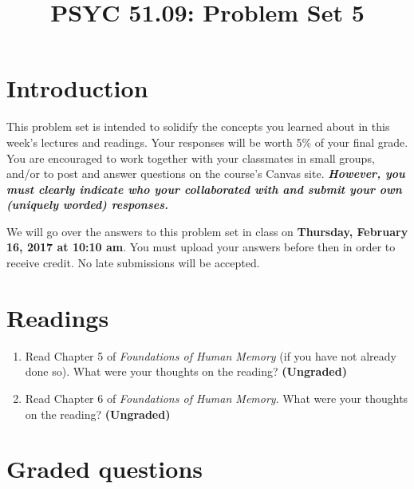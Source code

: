 \documentclass[11pt]{article}
\title{PSYC 51.09: Problem Set 5}
\date{}
\begin{document}
\maketitle
\vspace{-0.75in}
\section*{Introduction}
This problem set is intended to solidify the concepts you learned about in this week's lectures and readings.  Your responses will be worth 5\% of your final grade.  You are encouraged to work together with your classmates in small groups, and/or to post and answer questions on the course’s Canvas site.  \textbf{\textit{However, you must clearly indicate who your collaborated with and submit your own (uniquely worded) responses.}}

We will go over the answers to this problem set in class on \textbf{Thursday, February 16, 2017 at 10:10 am}.  You must upload your answers before then in order to receive credit.  No late submissions will be accepted.

\section*{Readings}
\begin{enumerate}
\item Read Chapter 5 of \textit{Foundations of Human Memory} (if you
  have not already done so).  What were your thoughts on the reading?
  \textbf{(Ungraded)}

\item Read Chapter 6 of \textit{Foundations of Human Memory}.  What were your thoughts on the reading?
  \textbf{(Ungraded)}
\end{enumerate}

\section*{Graded questions}
\end{document}

